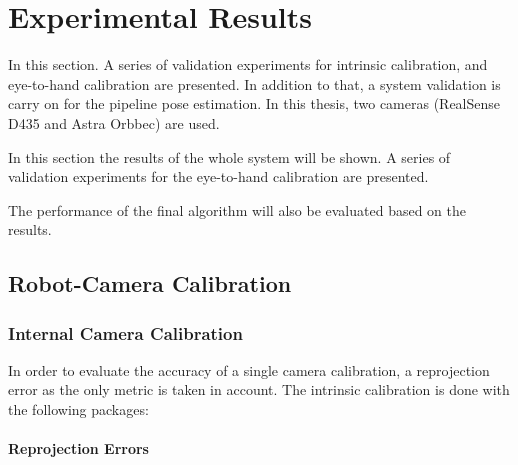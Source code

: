 
\chapter{Experimental Results}
\label{chap:exp}

In this section. A series of validation experiments for intrinsic calibration, and eye-to-hand calibration are presented. In addition to that, a system validation is carry on for the pipeline pose estimation. In this thesis, two cameras (RealSense D435 and Astra Orbbec) are used.  

In this section the results of the whole system will be shown. A series of validation experiments for the eye-to-hand calibration are presented. 

The performance of the final algorithm will also be evaluated based on the results.

\section{Robot-Camera Calibration}

\subsection{Internal Camera Calibration}
In order to evaluate the accuracy of a single camera calibration, a reprojection error as the only metric is taken in account.  The intrinsic calibration is done with the following packages:


\subsubsection{Reprojection Errors}

